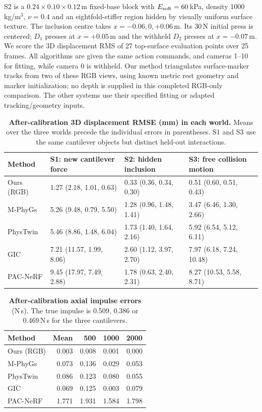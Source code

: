 S2 is a $0.24\times0.10\times0.12$\,m fixed-base block with $E_{\rm soft}=60$\,kPa, density 1000\,kg/m$^3$, $\nu=0.4$ and an eightfold-stiffer region hidden by visually uniform surface texture. The inclusion centre takes $x=-0.06,0,+0.06$\,m. Its 30\,N initial press is centered; $D_1$ presses at $x=+0.05$\,m and the withheld $D_2$ presses at $x=-0.07$\,m. We score the 3D displacement RMS of 27 top-surface evaluation points over 25 frames. All algorithms are given the same action commands, and cameras 1--10 for fitting, while camera 0 is withheld. Our method triangulates surface-marker tracks from two of these RGB views, using known metric rest geometry and marker initialization; no depth is supplied in this completed RGB-only comparison. The other systems use their specified fitting or adapted tracking/geometry inputs.

\begin{table}[t]
\centering\small
\caption{\textbf{After-calibration 3D displacement RMSE (mm) in each world.} Means over the three worlds precede the individual errors in parentheses. S1 and S3 use the same cantilever objects but distinct held-out interactions.}
\label{tab:supp-fig1-worlds}
\setlength{\tabcolsep}{5pt}
\begin{tabular}{@{}llll@{}}
\toprule
Method & S1: new cantilever force & S2: hidden inclusion & S3: free collision motion\\
\midrule
Ours (RGB) & 1.27 (2.18, 1.01, 0.63) & 0.33 (0.36, 0.34, 0.30) & 0.51 (0.60, 0.51, 0.43)\\
M-PhyGs & 5.26 (9.48, 0.79, 5.50) & 1.28 (0.96, 1.48, 1.41) & 3.47 (6.46, 1.30, 2.66)\\
PhysTwin & 5.46 (8.86, 1.48, 6.04) & 1.73 (1.40, 1.64, 2.16) & 5.92 (6.54, 5.12, 6.11)\\
GIC & 7.21 (11.57, 1.99, 8.06) & 2.60 (1.12, 3.97, 2.70) & 7.97 (6.18, 7.24, 10.48)\\
PAC-NeRF & 9.45 (17.97, 7.49, 2.88) & 1.78 (0.63, 2.40, 2.31) & 8.27 (10.53, 5.58, 8.71)\\
\bottomrule
\end{tabular}
\end{table}

\begin{table}[t]
\centering\small
\caption{\textbf{After-calibration axial impulse errors} (N\,s). The true impulse is 0.509, 0.386 or 0.469\,N\,s for the three cantilevers.}
\label{tab:supp-fig1-impulse}
\begin{tabular}{@{}lrrrr@{}}
\toprule
Method & Mean & 500 & 1000 & 2000\\
\midrule
Ours (RGB) & 0.003 & 0.008 & 0.001 & 0.000\\
M-PhyGs & 0.073 & 0.136 & 0.029 & 0.053\\
PhysTwin & 0.086 & 0.123 & 0.080 & 0.055\\
GIC & 0.069 & 0.125 & 0.003 & 0.079\\
PAC-NeRF & 1.771 & 1.931 & 1.584 & 1.798\\
\bottomrule
\end{tabular}
\end{table}

